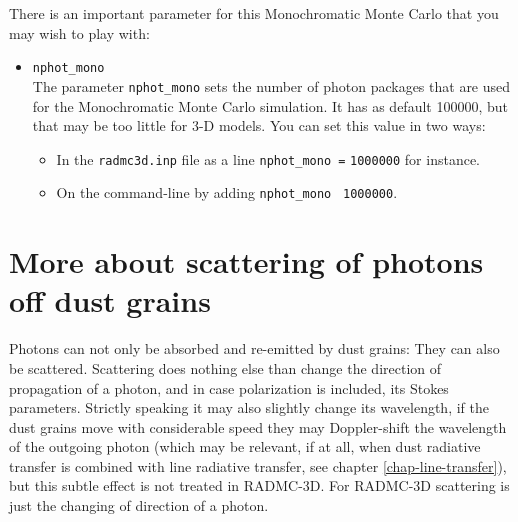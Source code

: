 \documentclass{report}
\begin{document}
There is an important parameter for this Monochromatic Monte Carlo that you
may wish to play with:
\begin{itemize}
\item {\small\tt nphot\_mono}\\
  The parameter {\small\tt nphot\_mono} sets the number of photon packages
  that are used for the Monochromatic Monte Carlo simulation. It has as
  default 100000, but that may be too little for 3-D models. You can set
  this value in two ways:
  \begin{itemize}
    \item In the {\small\tt radmc3d.inp} file as a line {\small\tt nphot\_mono =}
      {\small\tt 1000000} for instance.
    \item On the command-line by adding {\small\tt nphot\_mono} {\small\tt 
        1000000}. 
  \end{itemize}
\end{itemize}




\section{More about scattering of photons off dust grains}
\label{sec-scattering}
%
Photons can not only be absorbed and re-emitted by dust grains: They can
also be scattered. Scattering does nothing else than change the direction of
propagation of a photon, and in case polarization is included, its Stokes
parameters. Strictly speaking it may also slightly change its wavelength, if
the dust grains move with considerable speed they may Doppler-shift the
wavelength of the outgoing photon (which may be relevant, if at all, when
dust radiative transfer is combined with line radiative transfer, see
chapter \ref{chap-line-transfer}), but this subtle effect is not treated in
RADMC-3D. For RADMC-3D scattering is just the changing of direction of a
photon.
\end{document}
